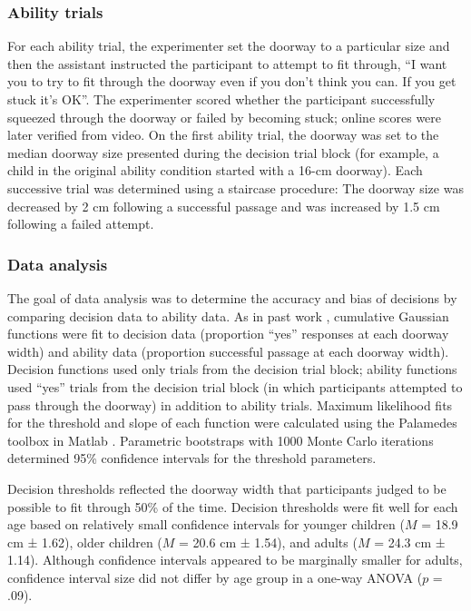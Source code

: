 \documentclass[a4paper,man,natbib,floatsintext,noextraspace]{apa6}
\begin{document}
\subsubsection{Ability trials}

For each ability trial, the experimenter set the doorway to a particular size and then the assistant instructed the participant to attempt to fit through, “I want you to try to fit through the doorway even if you don’t think you can. If you get stuck it’s OK”. The experimenter scored whether the participant successfully squeezed through the doorway or failed by becoming stuck; online scores were later verified from video. On the first ability trial, the doorway was set to the median doorway size presented during the decision trial block (for example, a child in the original ability condition started with a 16-cm doorway). Each successive trial was determined using a staircase procedure: The doorway size was decreased by 2 cm following a successful passage and was increased by 1.5 cm following a failed attempt.

\subsubsection{Data analysis}

The goal of data analysis was to determine the accuracy and bias of decisions by comparing decision data to ability data. As in past work \citep{Recal,PregAps}, cumulative Gaussian functions were fit to decision data (proportion “yes” responses at each doorway width) and ability data (proportion successful passage at each doorway width). Decision functions used only trials from the decision trial block; ability functions used “yes” trials from the decision trial block (in which participants attempted to pass through the doorway) in addition to ability trials. Maximum likelihood fits for the threshold and slope of each function were calculated using the Palamedes toolbox \citep{KingdomPrins}in Matlab . Parametric bootstraps with 1000 Monte Carlo iterations determined 95\% confidence intervals for the threshold parameters. 

Decision thresholds reflected the doorway width that participants judged to be possible to fit through 50\% of the time. Decision thresholds were fit well for each age based on relatively small confidence intervals for younger children ($M$ = 18.9 cm ± 1.62), older children ($M$ = 20.6 cm ± 1.54), and adults ($M$ = 24.3 cm ± 1.14). Although confidence intervals appeared to be marginally smaller for adults, confidence interval size did not differ by age group in a one-way ANOVA ($p$ = .09). 
\end{document}
